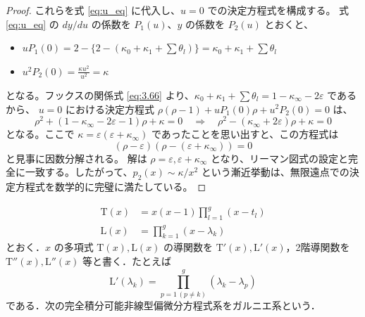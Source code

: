 \begin{Q}[【計算の検証】$x \to \infty$ における $p_2(x) \sim \kappa/x^2$ という振る舞いは、座標変換 $x=1/u$ を経た後の $u=0$ での決定方程式を正しく満たしているか？]
\begin{proof}
これらを式 \eqref{eq:u_eq} に代入し、$u=0$ での決定方程式を構成する。
式 \eqref{eq:u_eq} の $dy/du$ の係数を $P_1(u)$、$y$ の係数を $P_2(u)$ とおくと、
\begin{itemize}
    \item $u P_1(0) = 2 - \{2 - (\kappa_0 + \kappa_1 + \sum \theta_l)\} = \kappa_0 + \kappa_1 + \sum \theta_l$
    \item $u^2 P_2(0) = \frac{\kappa u^2}{u^2} = \kappa$
\end{itemize}
となる。フックスの関係式 \eqref{eq:3.66} より、$\kappa_0 + \kappa_1 + \sum \theta_l = 1 - \kappa_\infty - 2\varepsilon$ であるから、
$u=0$ における決定方程式 $\rho(\rho-1) + uP_1(0)\rho + u^2P_2(0) = 0$ は、
\begin{equation*}
\rho^2 + (1 - \kappa_\infty - 2\varepsilon - 1)\rho + \kappa = 0 \quad \Longrightarrow \quad \rho^2 - (\kappa_\infty + 2\varepsilon)\rho + \kappa = 0
\end{equation*}
となる。ここで $\kappa = \varepsilon(\varepsilon + \kappa_\infty)$ であったことを思い出すと、この方程式は
\begin{equation*}
(\rho - \varepsilon)(\rho - (\varepsilon + \kappa_\infty)) = 0
\end{equation*}
と見事に因数分解される。
解は $\rho = \varepsilon, \varepsilon + \kappa_\infty$ となり、リーマン図式の設定と完全に一致する。したがって、$p_2(x) \sim \kappa/x^2$ という漸近挙動は、無限遠点での決定方程式を数学的に完璧に満たしている。
\end{proof}
\end{Q}

\begin{story}
\begin{align}
\mathrm{T}(x) &= x(x-1) \prod_{l=1}^g (x-t_l) \label{eq:3.69} \\
\mathrm{L}(x) &= \prod_{k=1}^g (x-\lambda_k) \label{eq:3.70}
\end{align}
とおく．$x$ の多項式 $\mathrm{T}(x), \mathrm{L}(x)$ の導関数を $\mathrm{T}'(x), \mathrm{L}'(x)$，2階導関数を $\mathrm{T}''(x), \mathrm{L}''(x)$ 等と書く．たとえば
\begin{equation*}
\mathrm{L}'(\lambda_k) = \prod_{p=1 \, (p \neq k)}^g (\lambda_k - \lambda_p)
\end{equation*}
である．次の完全積分可能非線型偏微分方程式系をガルニエ系という．
\end{story}

